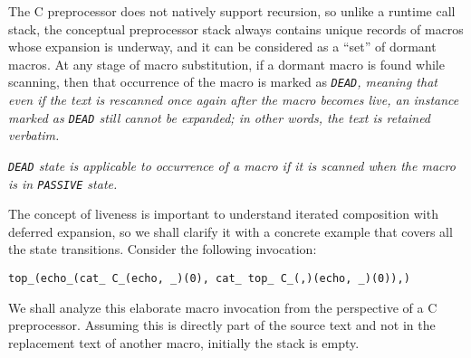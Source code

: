 The C preprocessor does not natively support recursion, so unlike a runtime call
stack, the conceptual preprocessor stack always contains unique records of macros
whose expansion is underway, and it can be considered as a ``set'' of dormant macros.
At any stage of macro substitution, if a dormant macro is found while scanning,
then that occurrence of the macro is marked as \it{\tt{DEAD}},
meaning that even if the text is rescanned once again after the
macro becomes live, an instance marked as \it{\tt{DEAD}} still
cannot be expanded; in other words, the text is retained verbatim.

\note \it{\tt{DEAD}} state is applicable to occurrence of a macro
if it is scanned when the macro is in \it{\tt{PASSIVE}} state.

\example The concept of liveness is important to understand iterated composition
with deferred expansion, so we shall clarify it with a concrete example
that covers all the state transitions. Consider the following invocation:

\centerline{\tt{top_(echo_(cat_ C_(echo, _)(0), cat_ top_ C_(,)(echo, _)(0)),)}}

We shall analyze this elaborate macro invocation
from the perspective of a C preprocessor.
Assuming this is directly part of the source text and not in the
replacement text of another macro, initially the stack is empty.

